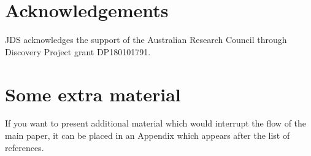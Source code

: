 \documentclass[fleqn,usenatbib,letters]{mnras}
\begin{document}
\section*{Acknowledgements}

JDS acknowledges the support of the Australian Research Council through Discovery Project grant DP180101791.









\appendix

\section{Some extra material}

If you want to present additional material which would interrupt the flow of the main paper,
it can be placed in an Appendix which appears after the list of references.



\bsp	%
\label{lastpage}
\end{document}
